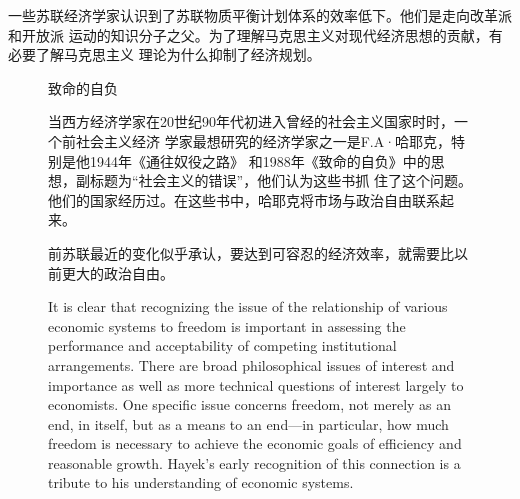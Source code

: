 一些苏联经济学家认识到了苏联物质平衡计划体系的效率低下。他们是走向改革派和开放派
运动的知识分子之父。为了理解马克思主义对现代经济思想的贡献，有必要了解马克思主义
理论为什么抑制了经济规划。

\begin{figure}[ht]
\begin{mybox}{致命的自负}
  \begin{multicols}{2}
    当西方经济学家在20世纪90年代初进入曾经的社会主义国家时时，一个前社会主义经济
    学家最想研究的经济学家之一是F.A·哈耶克，特别是他1944年《通往奴役之路》
    和1988年《致命的自负》中的思想，副标题为“社会主义的错误”，他们认为这些书抓
    住了这个问题。他们的国家经历过。在这些书中，哈耶克将市场与政治自由联系起来。

    前苏联最近的变化似乎承认，要达到可容忍的经济效率，就需要比以前更大的政治自由。

    It is clear that recognizing the issue of the relationship of various
    economic systems to freedom is important in assessing the performance and
    acceptability of competing institutional arrangements. There are broad
    philosophical issues of interest and importance as well as more technical
    questions of interest largely to economists. One specific issue concerns
    freedom, not merely as an end, in itself, but as a means to an end—in
    particular, how much freedom is necessary to achieve the economic goals of
    efficiency and reasonable growth. Hayek’s early recognition of this
    connection is a tribute to his understanding of economic
    systems.
  \end{multicols}
\end{mybox}
\end{figure}


